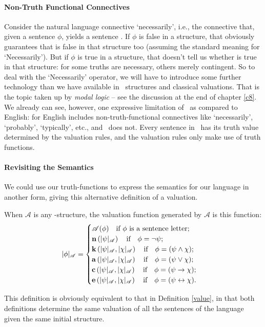 \paragraph{Non-Truth Functional Connectives} Consider the natural language connective `necessarily', i.e., the connective that, given a sentence $\phi$, yields a sentence . If $\phi$ is false in a structure, that obviously guarantees that  is false in that structure too (assuming the standard meaning for ‘Necessarily’). But if $\phi$ is true in a structure, that doesn't tell us whether  is true in that structure: for some truths are necessary, others merely contingent. So to deal with the `Necessarily' operator, we will have to introduce some further technology than we have available in \lone\ structures and classical valuations. That is the topic taken up by \emph{modal logic} – see the discussion at the end of chapter \ref{c8}. We already can see, however, one expressive limitation of \lone\ as compared to English: for English includes non-truth-functional connectives like `necessarily', `probably', `typically', etc., and \lone\ does not. Every sentence in \lone\ has its truth value determined by the valuation rules, and the valuation rules only make use of truth functions.

\paragraph{Revisiting the Semantics} We could use our truth-functions to express the semantics for our language in another form, giving this alternative definition of a valuation. \begin{definition}
	When $\mathscr{A}$ is any \lone-structure, the valuation function generated by $\mathscr{A}$ is this function\label{val2}: $$|\phi|_{\mathscr{A}} = \begin{cases}
		\mathscr{A}(\phi) \quad\text{if $\phi$ is a sentence letter};\\
		\mathbf{n}\left(|\psi|_{\mathscr{A}}\right) \quad\text{if}\quad \phi = \neg\psi;\\
		\mathbf{k}\left(|\psi|_{\mathscr{A}},|\chi|_{\mathscr{A}}\right) \quad\text{if}\quad \phi = (\psi \wedge \chi);\\ 
		\mathbf{a}\left(|\psi|_{\mathscr{A}},|\chi|_{\mathscr{A}}\right) \quad\text{if}\quad \phi = (\psi \vee \chi);\\
		\mathbf{c}\left(|\psi|_{\mathscr{A}},|\chi|_{\mathscr{A}}\right) \quad\text{if}\quad \phi = (\psi \to \chi);\\
		\mathbf{e}\left(|\psi|_{\mathscr{A}},|\chi|_{\mathscr{A}}\right) \quad\text{if}\quad \phi = (\psi \leftrightarrow \chi).\\ 
	\end{cases}$$
\end{definition} This definition is obviously equivalent to that in Definition \ref{value}, in that both definitions determine the same valuation of all the sentences of the language given the same initial structure.





